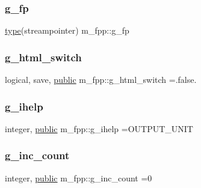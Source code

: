 \mbox{\label{namespacem__fpp_a90e1828ada2e3a70200d2172c2ca9ef2}} 
\subsubsection{\texorpdfstring{g\+\_\+fp}{g\_fp}}
{\footnotesize\ttfamily \hyperlink{stop__watch_83_8txt_a70f0ead91c32e25323c03265aa302c1c}{type}(streampointer) m\+\_\+fpp\+::g\+\_\+fp}

\mbox{\label{namespacem__fpp_aa54b63082124b77a4beec31b6e702f7d}} 
\subsubsection{\texorpdfstring{g\+\_\+html\+\_\+switch}{g\_html\_switch}}
{\footnotesize\ttfamily logical, save, \hyperlink{M__stopwatch_83_8txt_a2f74811300c361e53b430611a7d1769f}{public} m\+\_\+fpp\+::g\+\_\+html\+\_\+switch =.false.}

\mbox{\label{namespacem__fpp_ae0b89e9d5583b98efa43c34378112eca}} 
\subsubsection{\texorpdfstring{g\+\_\+ihelp}{g\_ihelp}}
{\footnotesize\ttfamily integer, \hyperlink{M__stopwatch_83_8txt_a2f74811300c361e53b430611a7d1769f}{public} m\+\_\+fpp\+::g\+\_\+ihelp =O\+U\+T\+P\+U\+T\+\_\+\+U\+N\+IT}

\mbox{\label{namespacem__fpp_ac4ca8efb06bd0c3da1498d32f0425e3f}} 
\subsubsection{\texorpdfstring{g\+\_\+inc\+\_\+count}{g\_inc\_count}}
{\footnotesize\ttfamily integer, \hyperlink{M__stopwatch_83_8txt_a2f74811300c361e53b430611a7d1769f}{public} m\+\_\+fpp\+::g\+\_\+inc\+\_\+count =0}

